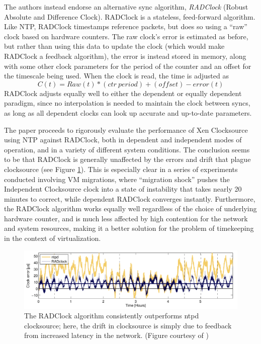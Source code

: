 \documentclass[letterpaper, twocolumn]{article}
\begin{document}
The authors instead endorse an alternative sync algorithm, \emph{RADClock}
(Robust Absolute and Difference Clock).  RADClock is a stateless, feed-forward
algorithm.  Like NTP, RADClock timestamps reference packets, but does so using
a ``raw'' clock based on hardware counters.  The raw clock's error is estimated
as before, but rather than using this data to update the clock (which would make
RADClock a feedback algorithm), the error is instead stored in memory, along
with some other clock parameters for the period of the counter and an offset
for the timescale being used.  When the clock is read, the time is adjusted
as
\[
	C(t) = Raw(t) * (ctr~period) + (offset) - error(t)
\]
RADClock adjusts equally well to either the dependent or equally dependent paradigm,
since no interpolation is needed to maintain the clock between syncs, as long
as all dependent clocks can look up accurate and up-to-date parameters.

The paper proceeds to rigorously evaluate the performance of Xen Clocksource
using NTP against RADClock, both in dependent and independent modes of
operation, and in a variety of different system conditions.  The conclusion
seems to be that RADClock is generally unaffected by the errors and
drift that plague clocksource (see Figure \ref{fig:time-eval}).
This is especially clear in a series of
experiments conducted involving VM migrations, where ``migration shock''
pushes the Independent Clocksource clock into a state of instability that
takes nearly 20 minutes to correct, while dependent RADClock converges
instantly.  Furthermore, the RADClock algorithm works equally well
regardless of the choice of underlying hardware counter, and is much
less affected by high contention for the network and system resources,
making it a better solution for the problem of timekeeping in the
context of virtualization.

\begin{figure}[t]
	\caption{The RADClock algorithm consistently outperforms ntpd clocksource;
		here, the drift in clocksource is simply due to feedback from increased
		latency in the network. (Figure courtesy of \cite{ref:time})}
	\label{fig:time-eval}
	\begin{center}
		\includegraphics[width=6in]{images/time.png}
	\end{center}
\end{figure}
\end{document}
